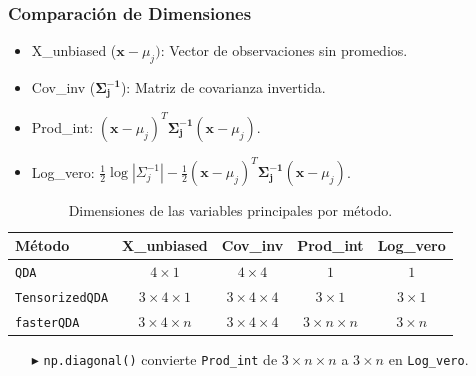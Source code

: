 \begin{frame}
  \frametitle{Comparación de Dimensiones}

  \begin{itemize}
    \item X\_unbiased (\(\mathbf{x} - \mu_j)\): Vector de observaciones sin promedios.
    \item Cov\_inv (\(\mathbf{\Sigma_j^{-1}}\)): Matriz de covarianza invertida.
    \item Prod\_int: \((\mathbf{x} - \mu_j)^T \mathbf{\Sigma_j^{-1}} (\mathbf{x} - \mu_j)\).
    \item Log\_vero: \( \frac{1}{2} \log{\left|\Sigma_j^{-1}\right|} - \frac{1}{2} (\mathbf{x} - \mu_j)^T \mathbf{\Sigma_j^{-1}} (\mathbf{x} - \mu_j)\).


  \end{itemize}

  \begin{table}[h!]
    \centering
    \begin{tabular}{@{}lcccc@{}}
      \toprule
      \textbf{Método}     		  & X\_unbiased 				 	&Cov\_inv 				 & Prod\_int				& 	 Log\_vero		 	 \\ 
      \midrule
      \texttt{QDA}         		 & \(4 \times 1\)              		    & \(4 \times 4\)           		 & \(1\)            			& 	 \cellcolor{yellow}\(1\)				 \\ 
      \texttt{TensorizedQDA}	 & \(3 \times 4 \times 1\)           & \(3 \times 4 \times 4\)     & \(3 \times 1 \)		 	& 	\cellcolor{yellow} \(3 \times 1\)		\\ 
      \texttt{fasterQDA}  	  	 & \(3 \times 4 \times n\)           & \(3 \times 4 \times 4\)     & \(3 \times n \times n\) & 	\cellcolor{yellow}\(3 \times n \) 		\\ 
      \bottomrule
    \end{tabular}
    \caption{Dimensiones de las variables principales por método.}
  \end{table}

  \begin{itemize}
    \item[$\blacktriangleright$]\texttt{np.diagonal()} convierte \texttt{Prod\_int} de \(3 \times n \times n\) a \(3 \times n\) en \texttt{Log\_vero}.
  \end{itemize}

\end{frame}


